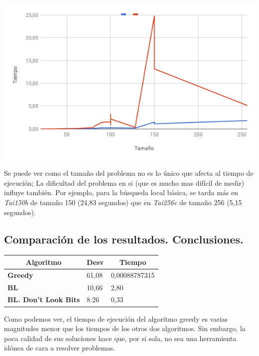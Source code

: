 \documentclass[a4paper, 12pt]{article}
\begin{document}
      \begin{center}
         \includegraphics[scale=0.6]{bl-vs-dlb}
      \end{center}
      
      Se puede ver como el tamaño del problema no es lo único que afecta al tiempo de ejecución; La dificultad del problema en si (que es mucho mas difícil de medir) influye también. Por ejemplo, para la búsqueda local básica, se tarda más en \textit{Tai150b} de tamaño 150 (24,83 segundos) que en \textit{Tai256c} de tamaño 256 (5,15 segundos).
      
      
      \newpage
      \subsection*{Comparación de los resultados. Conclusiones.}
\begin{table}[H]
\centering
\label{my-label}
\begin{tabular}{|l|l|l|}
\hline
\multicolumn{1}{|c|}{\textbf{Algoritmo}} & \textbf{Desv} & \multicolumn{1}{c|}{\textbf{Tiempo}} \\ \hline
\textbf{Greedy}                          & 61,08         & 0,00088787315                        \\ \hline
\textbf{BL}                              & 10,66         & 2,80                                 \\ \hline
\textbf{BL. Don't Look Bits}             & 8.26          & 0,33                                 \\ \hline
\end{tabular}
\end{table}
      
      Como podemos ver, el tiempo de ejecución del algoritmo greedy es varias magnitudes menor que los tiempos de los otros dos algoritmos. Sin embargo, la poca calidad de sus soluciones hace que, por si sola, no sea una herramienta idónea de cara a resolver problemas.\\
      
\end{document}
